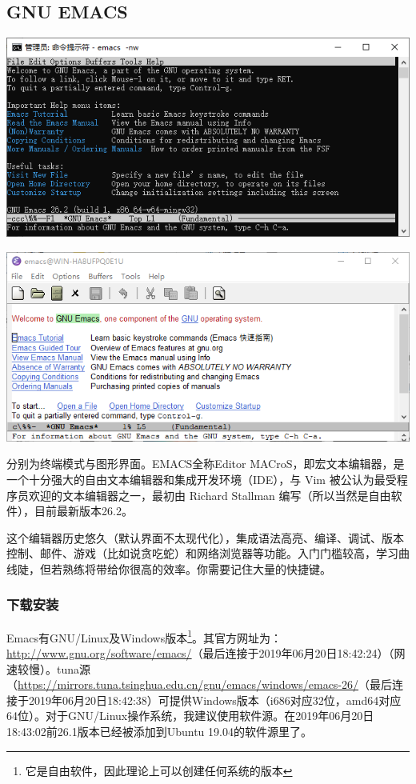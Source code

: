 \documentclass{book}
\begin{document}
\subsection{GNU EMACS}
\begin{center}
	\includegraphics[scale=0.8]{pic/emacs-terminal}\par   \includegraphics[scale=0.8]{pic/Emacs-GUI}
\end{center}
分别为终端模式与图形界面。EMACS全称Editor MACroS，即宏文本编辑器，是一个十分强大的自由文本编辑器和集成开发环境（IDE），与 Vim 被公认为最受程序员欢迎的文本编辑器之一，最初由 Richard Stallman 编写（所以当然是自由软件），目前最新版本26.2。\par
这个编辑器历史悠久（默认界面不太现代化），集成语法高亮、编译、调试、版本控制、邮件、游戏（比如说贪吃蛇）和网络浏览器等功能。入门门槛较高，学习曲线陡，但若熟练将带给你很高的效率。你需要记住大量的快捷键。\par
\subsubsection{下载安装}
Emacs有GNU/Linux及Windows版本\footnote{它是自由软件，因此理论上可以创建任何系统的版本}。其官方网址为：\url{http://www.gnu.org/software/emacs/}（最后连接于2019年06月20日18:42:24）（网速较慢）。tuna源（\url{https://mirrors.tuna.tsinghua.edu.cn/gnu/emacs/windows/emacs-26/}（最后连接于2019年06月20日18:42:38）可提供Windows版本（i686对应32位，amd64对应64位）。对于GNU/Linux操作系统，我建议使用软件源。在2019年06月20日18:43:02前26.1版本已经被添加到Ubuntu 19.04的软件源里了。
\end{document}
